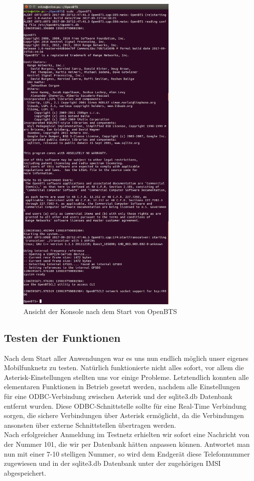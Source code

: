 \newpage
\begin{figure}[htbp]
	\centering
		\includegraphics[width=0.70\textwidth]{includes/Start_OpenBTS}
	\caption{Ansicht der Konsole nach dem Start von OpenBTS}
	\label{fig:start_OpenBTS}
\end{figure}

\subsection{Testen der Funktionen}
Nach dem Start aller Anwendungen war es uns nun endlich möglich unser eigenes Mobilfunknetz zu testen. Natürlich funktionierte nicht alles sofort, vor allem die Asterisk-Einstellungen stellten uns vor einige Probleme. Letztendlich konnten alle elementaren Funktionen in Betrieb gesetzt werden, nachdem alle Einstellungen für eine ODBC-Verbindung zwischen Asterisk und der sqlite3.db Datenbank entfernt wurden. Diese ODBC-Schnittstelle sollte für eine Real-Time Verbindung sorgen, die sichere Verbindungen über Asterisk ermöglicht, da die Verbindungen ansonsten über externe Schnittstellen übertragen werden.\\
Nach erfolgreicher Anmeldung im Testnetz erhielten wir sofort eine Nachricht von der Nummer 101, die wir per Datenbank hätten anpassen können. Antwortet man nun mit einer 7-10 stelligen Nummer, so wird dem Endgerät diese Telefonnummer zugewiesen und in der sqlite3.db Datenbank unter der zugehörigen IMSI abgespeichert.

